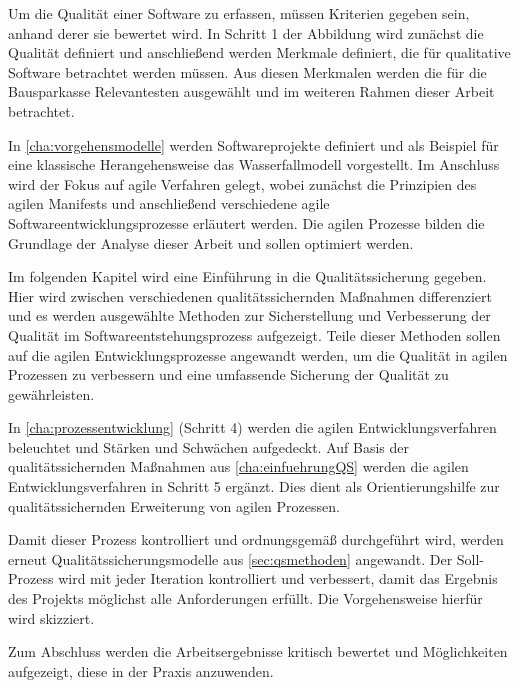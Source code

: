         Um die Qualität einer Software zu erfassen, müssen Kriterien gegeben sein, anhand derer sie bewertet wird. In Schritt 1 der Abbildung wird zunächst die Qualität definiert und anschließend werden Merkmale definiert, die für qualitative Software betrachtet werden müssen. Aus diesen Merkmalen werden die für die Bausparkasse Relevantesten ausgewählt und im weiteren Rahmen dieser Arbeit betrachtet.

        In \autoref{cha:vorgehensmodelle} werden Softwareprojekte definiert und als Beispiel für eine klassische Herangehensweise das Wasserfallmodell vorgestellt. Im Anschluss wird der Fokus auf agile Verfahren gelegt, wobei zunächst die Prinzipien des agilen Manifests und anschließend verschiedene agile Softwareentwicklungsprozesse erläutert werden. Die agilen Prozesse bilden die Grundlage der Analyse dieser Arbeit und sollen optimiert werden.

        Im folgenden Kapitel wird eine Einführung in die Qualitätssicherung gegeben. Hier wird zwischen verschiedenen qualitätssichernden Maßnahmen differenziert und es werden ausgewählte Methoden zur Sicherstellung und Verbesserung der Qualität im Softwareentstehungsprozess aufgezeigt. Teile dieser Methoden sollen auf die agilen Entwicklungsprozesse angewandt werden, um die Qualität in agilen Prozessen zu verbessern und eine umfassende Sicherung der Qualität zu gewährleisten.

        In \autoref{cha:prozessentwicklung} (Schritt 4) werden die agilen Entwicklungsverfahren beleuchtet und Stärken und Schwächen aufgedeckt. Auf Basis der qualitätssichernden Maßnahmen aus \autoref{cha:einfuehrungQS} werden die agilen Entwicklungsverfahren in Schritt 5 ergänzt. Dies dient als Orientierungshilfe zur qualitätssichernden Erweiterung von agilen Prozessen.

        Damit dieser Prozess kontrolliert und ordnungsgemäß durchgeführt wird, werden erneut Qualitätssicherungsmodelle aus \autoref{sec:qsmethoden} angewandt. Der Soll-Prozess wird mit jeder Iteration kontrolliert und verbessert, damit das Ergebnis des Projekts möglichst alle Anforderungen erfüllt. Die Vorgehensweise hierfür wird skizziert.

        Zum Abschluss werden die Arbeitsergebnisse kritisch bewertet und Möglichkeiten aufgezeigt, diese in der Praxis anzuwenden. 